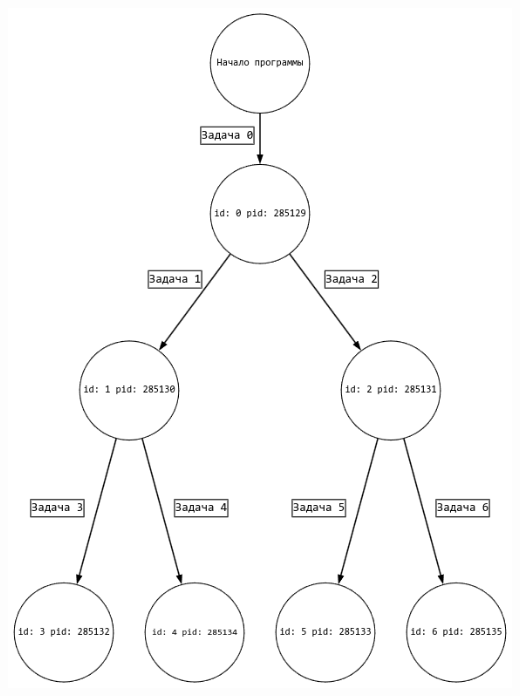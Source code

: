 \documentclass[a4paper,14pt]{extarticle}
\begin{document}
\includegraphics[width=140mm]{main.png}\\
\end{document}
